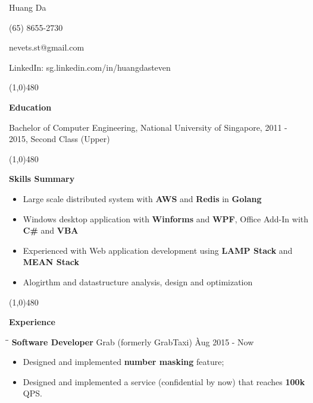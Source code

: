 \documentclass[9pt]{article}
\begin{document}
\centerline{{\Huge \sc Huang Da} }
\centerline{(65) 8655-2730}
\centerline{nevets.st@gmail.com}
\centerline{LinkedIn: sg.linkedin.com/in/huangdasteven}

\noindent

\centerline{\line(1,0){480}}

\medskip

\centerline {\Large \bf Education}

\smallskip

Bachelor of Computer Engineering, National University of Singapore, 2011 - 2015, Second Class (Upper)

\centerline{\line(1,0){480}}

\medskip

\centerline {\Large \bf {Skills Summary}}

\vspace{-6pt}\smallskip

\begin{itemize} 
  \item Large scale distributed system with {\bf AWS} and {\bf Redis} in {\bf Golang} \vspace{-6pt}
  \item Windows desktop application with {\bf Winforms} and {\bf WPF}, Office Add-In with {\bf C\#}  and {\bf VBA}\vspace{-6pt}
  \item Experienced with Web application development using {\bf LAMP Stack} and {\bf MEAN Stack} \vspace{-6pt}
  \item Alogirthm and datastructure analysis, design and optimization \vspace{-6pt}
\end{itemize}

\centerline{\line(1,0){480}}

\medskip

\centerline {\Large \bf Experience}

\medskip


\begin{tabbing}
\hspace{2.6in}\= \hspace{2.6in}\= \kill
{\bf Software Developer} \> Grab (formerly GrabTaxi) \`Aug 2015 - Now\
\end{tabbing}

\begin{itemize}
    \item Designed and implemented {\bf number masking} feature; \vspace{-6pt}
    \item Designed and implemented a service (confidential by now) that reaches {\bf 100k} QPS. \vspace{-6pt}
\end{itemize}
\end{document}
